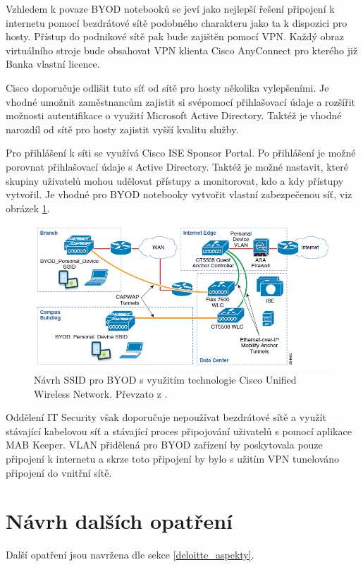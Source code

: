 Vzhledem k povaze BYOD notebooků se jeví jako nejlepší řešení připojení k internetu pomocí bezdrátové sítě podobného charakteru jako ta k dispozici pro hosty. Přístup do podnikové sítě pak bude zajištěn pomocí VPN. Každý obraz virtuálního stroje bude obsahovat VPN klienta Cisco AnyConnect pro kterého již Banka vlastní licence.

Cisco doporučuje \cite{CiscoDesign} odlišit tuto síť od sítě pro hosty několika vylepšeními. Je vhodné umožnit zaměstnancům zajistit si svépomocí přihlašovací údaje a rozšířit možnosti autentifikace o využití Microsoft Active Directory. Taktéž je vhodné narozdíl od sítě pro hosty zajistit vyšší kvalitu služby.

Pro přihlášení k síti se využívá Cisco ISE Sponsor Portal. Po přihlášení je možné porovnat přihlašovací údaje s Active Directory. Taktéž je možné nastavit, které skupiny uživatelů mohou udělovat přístupy a monitorovat, kdo a kdy přístupy vytvořil. Je vhodné pro BYOD notebooky vytvořit vlastní zabezpečenou síť, viz obrázek \ref{CiscoCUWN}.

\begin{figure}[h!]
\centering
\includegraphics[width=13cm]{img/CiscoCUWN}
\caption{Návrh SSID pro BYOD s využitím technologie Cisco Unified Wireless Network. Převzato z \cite{CiscoDesign}.}\label{CiscoCUWN}
\end{figure}

Oddělení IT Security však doporučuje nepoužívat bezdrátové sítě a využít stávající kabelovou síť a stávající proces připojování uživatelů s pomocí aplikace MAB Keeper. VLAN přidělená pro BYOD zařízení by poskytovala pouze připojení k internetu a skrze toto připojení by bylo s užitím VPN tunelováno připojení do vnitřní sítě. 



\section{Návrh dalších opatření}\label{dalsi_opatreni}
Další opatření jsou navržena dle sekce \ref{deloitte_aspekty}.


